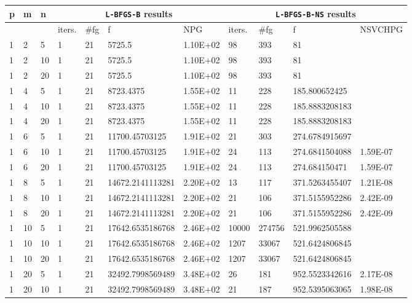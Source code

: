 \begin{table}
  \scriptsize
  \begin{center}
    \begin{tabular}{|l|l|l|l|l|l|l|l|l|l|l|}
      \hline
      p  &  m  &  n  & \multicolumn{4}{|c|}{\texttt{L-BFGS-B} results} & \multicolumn{4}{|c|}{\texttt{L-BFGS-B-NS} results} \\ \hline
      & &  & iters. & \#fg & f & NPG & iters. & \#fg & f & NSVCHPG \\ \hline
     1 & 2 & 5  & 1 & 21 & 5725.5 & 1.10E+02 & 98 & 393 & 81 &  \\
    1 &   2 & 10  & 1 & 21 & 5725.5 & 1.10E+02 & 98 & 393 & 81 & \\
    1 &   2 & 20 & 1 & 21 & 5725.5 & 1.10E+02 & 98 & 393 & 81 & \\
    1 &   4 & 5 & 1 & 21 & 8723.4375 & 1.55E+02 & 11 & 228 & 185.800652425 & \\
    1 &   4 & 10 & 1 & 21 & 8723.4375 & 1.55E+02 & 11 & 228 & 185.8883208183 & \\
     1 &  4 & 20 & 1 & 21 & 8723.4375 & 1.55E+02 & 11 & 228 & 185.8883208183 & \\
    1 &   6 & 5 & 1 & 21 & 11700.45703125 & 1.91E+02 & 21 & 303 & 274.6784915697 &\\ 
     1 &  6 & 10  & 1 & 21 & 11700.45703125 & 1.91E+02 & 24 & 113 & 274.6841504088 & 1.59E-07\\
    1 &   6 & 20  & 1 & 21 & 11700.45703125 & 1.91E+02 & 24 & 113 & 274.684150471 & 1.59E-07\\
    1 &   8 & 5 &  1 & 21 & 14672.2141113281 & 2.20E+02 & 13 & 117 & 371.5263455407 & 1.21E-08\\
    1 &   8 & 10  & 1 & 21 & 14672.2141113281 & 2.20E+02 & 21 & 106 & 371.5155952286 & 2.42E-09\\
     1 &  8 & 20  & 1 & 21 & 14672.2141113281 & 2.20E+02 & 21 & 106 & 371.5155952286 & 2.42E-09\\
    1 &   10 & 5  & 1 & 21 & 17642.6535186768 & 2.46E+02 & 10000 & 274756 & 521.9962505588 & \\
    1 &   10 & 10  & 1 & 21 & 17642.6535186768 & 2.46E+02 & 1207 & 33067 & 521.6424806845 & \\
     1 &  10 & 20  & 1 & 21 & 17642.6535186768 & 2.46E+02 & 1207 & 33067 & 521.6424806845 & \\
    1 &   20 & 5  & 1 & 21 & 32492.7998569489 & 3.48E+02 & 26 & 181 & 952.5523342616 & 2.17E-08\\
     1 &  20 & 10  & 1 & 21 & 32492.7998569489 & 3.48E+02 & 21 & 187 & 952.5395063065 & 1.98E-08\\

\end{tabular}
\end{center}
\end{table}
